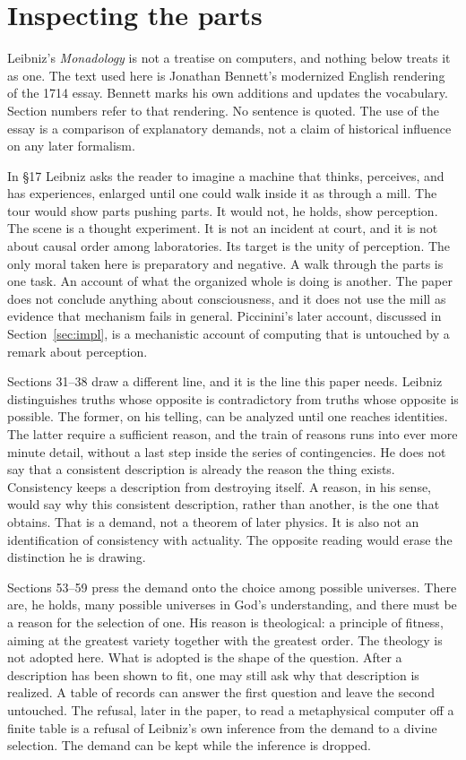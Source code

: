 \documentclass[11pt]{article}
\begin{document}
\section{Inspecting the parts}
\label{sec:leibniz}

Leibniz’s \emph{Monadology} is not a treatise on computers, and nothing below treats it as one. The text used here is Jonathan Bennett’s modernized English rendering of the 1714 essay. Bennett marks his own additions and updates the vocabulary. Section numbers refer to that rendering. No sentence is quoted. The use of the essay is a comparison of explanatory demands, not a claim of historical influence on any later formalism.

In \S 17 Leibniz asks the reader to imagine a machine that thinks, perceives, and has experiences, enlarged until one could walk inside it as through a mill. The tour would show parts pushing parts. It would not, he holds, show perception. The scene is a thought experiment. It is not an incident at court, and it is not about causal order among laboratories. Its target is the unity of perception. The only moral taken here is preparatory and negative. A walk through the parts is one task. An account of what the organized whole is doing is another. The paper does not conclude anything about consciousness, and it does not use the mill as evidence that mechanism fails in general. Piccinini’s later account, discussed in Section~\ref{sec:impl}, is a mechanistic account of computing that is untouched by a remark about perception.

Sections 31--38 draw a different line, and it is the line this paper needs. Leibniz distinguishes truths whose opposite is contradictory from truths whose opposite is possible. The former, on his telling, can be analyzed until one reaches identities. The latter require a sufficient reason, and the train of reasons runs into ever more minute detail, without a last step inside the series of contingencies. He does not say that a consistent description is already the reason the thing exists. Consistency keeps a description from destroying itself. A reason, in his sense, would say why this consistent description, rather than another, is the one that obtains. That is a demand, not a theorem of later physics. It is also not an identification of consistency with actuality. The opposite reading would erase the distinction he is drawing.

Sections 53--59 press the demand onto the choice among possible universes. There are, he holds, many possible universes in God’s understanding, and there must be a reason for the selection of one. His reason is theological: a principle of fitness, aiming at the greatest variety together with the greatest order. The theology is not adopted here. What is adopted is the shape of the question. After a description has been shown to fit, one may still ask why that description is realized. A table of records can answer the first question and leave the second untouched. The refusal, later in the paper, to read a metaphysical computer off a finite table is a refusal of Leibniz’s own inference from the demand to a divine selection. The demand can be kept while the inference is dropped.
\end{document}
